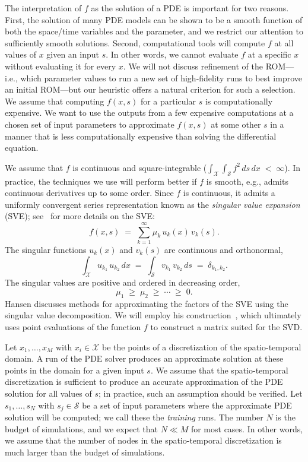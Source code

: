 \documentclass[final]{siamltex}
\begin{document}
The interpretation of $f$ as the solution of a PDE is important for
two reasons.  First, the solution of many PDE models can be shown to
be a smooth function of both the space/time variables and the
parameter, and we restrict our attention to sufficiently smooth
solutions. Second, computational tools will compute $f$ at all values
of $x$ given an input $s$. In other words, we cannot evaluate $f$ at a
specific $x$ without evaluating it for every $x$. We will not discuss
refinement of the ROM---i.e., which parameter values to run a new set
of high-fidelity runs to best improve an initial ROM---but our
heuristic offers a natural criterion for such a selection.  We assume
that computing $f(x,s)$ for a particular $s$ is computationally
expensive.  We want to use the outputs from a few expensive
computations at a chosen set of input parameters to approximate
$f(x,s)$ at some other $s$ in a manner that is less computationally
expensive than solving the differential equation.

We assume that $f$ is continuous and square-integrable ($\int_{\mathcal{X}}
\int_{\mathcal{S}} f^2 \,ds\,dx \;<\;\infty$). In practice, the techniques we
use will perform better if $f$ is smooth, e.g., admits continuous
derivatives up to some order.
Since $f$ is continuous, it admits a uniformly convergent series
representation known as the \emph{singular value expansion} (SVE);
see~\cite{Hansen1988} for more details on the SVE:
\begin{equation}
\label{eq:sve}
f(x,s) \;=\; \sum_{k=1}^\infty \mu_k\,u_k(x)\,v_k(s).
\end{equation}
The singular functions $u_k(x)$ and $v_k(s)$ are continuous and
orthonormal,
\begin{equation}
\int_{\mathcal{X}} u_{k_1}\,u_{k_2}\,dx \;=\; \int_{\mathcal{S}} v_{k_1}\,v_{k_2}\,ds
\;=\; \delta_{k_1,k_2}.
\end{equation}
The singular values are positive and ordered in decreasing order,
\begin{equation}
\mu_1 \;\geq\; \mu_2 \;\geq\; \cdots \;\geq\; 0.
\end{equation}
Hansen discusses methods for approximating the factors of the SVE
using the singular value decomposition. We will employ his
construction~\cite[Section 5]{Hansen1988}, which ultimately uses
point evaluations of the function $f$ to construct a matrix suited
for the SVD.

Let $x_1,\dots,x_M$ with $x_i\in{\mathcal{X}}$ be the points of a discretization
of the spatio-temporal domain. A run of the PDE solver produces an
approximate solution at these points in the domain for a given input
$s$. We assume that the spatio-temporal discretization is sufficient
to produce an accurate approximation of the PDE solution for all
values of $s$; in practice, such an assumption should be verified. Let
$s_1,\dots,s_N$ with $s_j\in{\mathcal{S}}$ be a set of input parameters where
the approximate PDE solution will be computed; we call these the
\emph{training} runs. 
The number $N$ is the budget of simulations, and we expect that $N\ll
M$ for most cases. In other words, we assume that the number of nodes
in the spatio-temporal discretization is much larger than the budget
of simulations.
\end{document}
